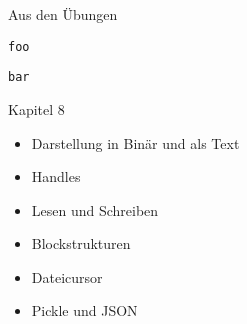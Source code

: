 
\begin{frame}[fragile]{Aus den Übungen}
%
\begin{tcbraster}[raster columns=2,
                  raster equal height,
                  nobeforeafter,
                  raster column skip=0.5cm]
\begin{codebox}
\begin{verbatim}
foo
\end{verbatim}
\end{codebox}
%
\begin{codebox}
\begin{verbatim}
bar
\end{verbatim}
\end{codebox}
\end{tcbraster}
%
\end{frame}


\begin{frame}[fragile]{Kapitel 8}
%
\begin{itemize}
\item Darstellung in Binär und als Text
\item Handles
\item Lesen und Schreiben
\item Blockstrukturen 
\item Dateicursor
\item Pickle und JSON
\end{itemize}
%
\end{frame}


